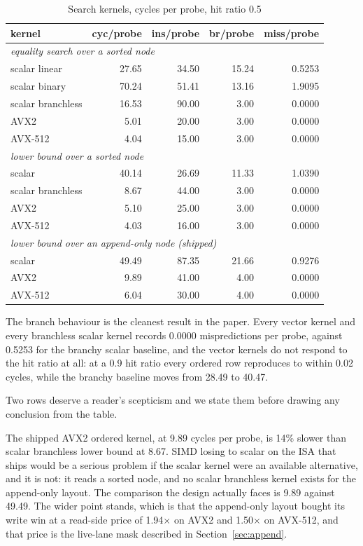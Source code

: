 \documentclass[conference]{IEEEtran}
\begin{document}
\begin{table}[t]
\caption{Search kernels, cycles per probe, hit ratio 0.5}
\label{tab:kernels}
\centering\small\setlength{\tabcolsep}{4pt}
\begin{tabular}{lrrrr}
\toprule
kernel & cyc/probe & ins/probe & br/probe & miss/probe \\
\midrule
\multicolumn{5}{l}{\emph{equality search over a sorted node}} \\
scalar linear      & 27.65 & 34.50 & 15.24 & 0.5253 \\
scalar binary      & 70.24 & 51.41 & 13.16 & 1.9095 \\
scalar branchless  & 16.53 & 90.00 &  3.00 & 0.0000 \\
AVX2               &  5.01 & 20.00 &  3.00 & 0.0000 \\
AVX-512            &  4.04 & 15.00 &  3.00 & 0.0000 \\
\midrule
\multicolumn{5}{l}{\emph{lower bound over a sorted node}} \\
scalar             & 40.14 & 26.69 & 11.33 & 1.0390 \\
scalar branchless  &  8.67 & 44.00 &  3.00 & 0.0000 \\
AVX2               &  5.10 & 25.00 &  3.00 & 0.0000 \\
AVX-512            &  4.03 & 16.00 &  3.00 & 0.0000 \\
\midrule
\multicolumn{5}{l}{\emph{lower bound over an append-only node (shipped)}} \\
scalar             & 49.49 & 87.35 & 21.66 & 0.9276 \\
AVX2               &  9.89 & 41.00 &  4.00 & 0.0000 \\
AVX-512            &  6.04 & 30.00 &  4.00 & 0.0000 \\
\bottomrule
\end{tabular}
\end{table}

The branch behaviour is the cleanest result in the paper. Every vector kernel and
every branchless scalar kernel records 0.0000 mispredictions per probe, against
0.5253 for the branchy scalar baseline, and the vector kernels do not respond to
the hit ratio at all: at a 0.9 hit ratio every ordered row reproduces to within
0.02 cycles, while the branchy baseline moves from 28.49 to 40.47.

Two rows deserve a reader's scepticism and we state them before drawing any
conclusion from the table.

The shipped AVX2 ordered kernel, at 9.89 cycles per probe, is 14\% slower than
scalar branchless lower bound at 8.67. SIMD losing to scalar on the ISA that ships
would be a serious problem if the scalar kernel were an available alternative, and
it is not: it reads a sorted node, and no scalar branchless kernel exists for the
append-only layout. The comparison the design actually faces is 9.89 against
49.49. The wider point stands, which is that the append-only layout bought its
write win at a read-side price of 1.94$\times$ on AVX2 and 1.50$\times$ on
AVX-512, and that price is the live-lane mask described in
Section~\ref{sec:append}.
\end{document}
